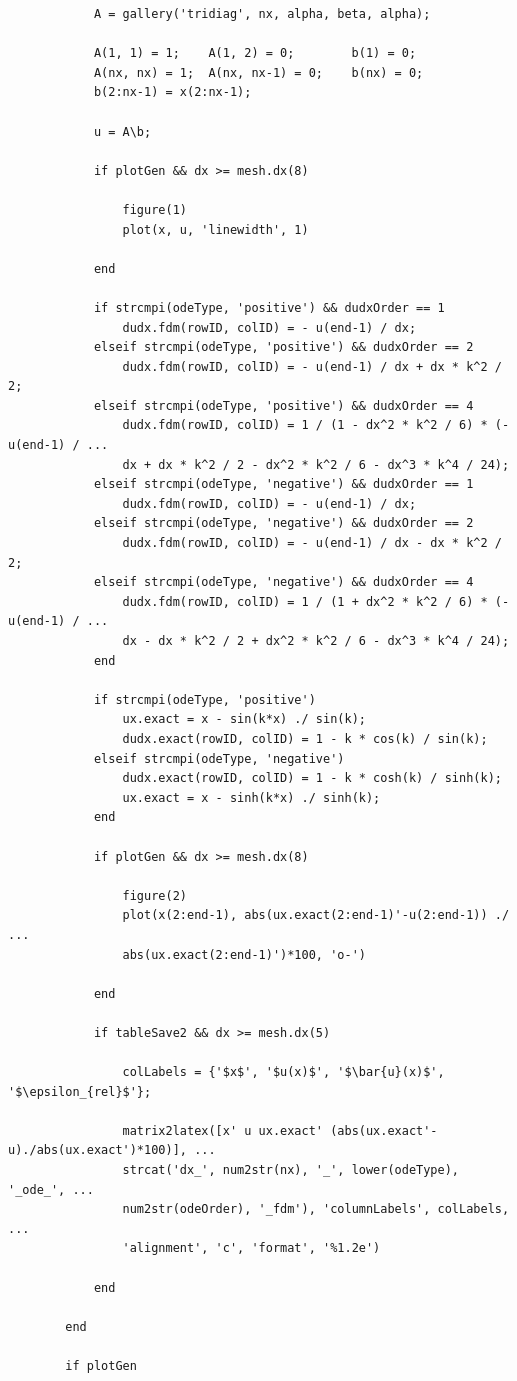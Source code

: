 \documentclass[10pt, reqno]{article}		%
\numberwithin{equation}{section}
\begin{document}
\begin{lstlisting}
			A = gallery('tridiag', nx, alpha, beta, alpha);
			
			A(1, 1) = 1;    A(1, 2) = 0;        b(1) = 0;
			A(nx, nx) = 1;  A(nx, nx-1) = 0;    b(nx) = 0;
			b(2:nx-1) = x(2:nx-1);
			
			u = A\b;
			
			if plotGen && dx >= mesh.dx(8)
			
				figure(1)
				plot(x, u, 'linewidth', 1)
			
			end
			
			if strcmpi(odeType, 'positive') && dudxOrder == 1
				dudx.fdm(rowID, colID) = - u(end-1) / dx;
			elseif strcmpi(odeType, 'positive') && dudxOrder == 2
				dudx.fdm(rowID, colID) = - u(end-1) / dx + dx * k^2 / 2;
			elseif strcmpi(odeType, 'positive') && dudxOrder == 4
				dudx.fdm(rowID, colID) = 1 / (1 - dx^2 * k^2 / 6) * (-u(end-1) / ...
				dx + dx * k^2 / 2 - dx^2 * k^2 / 6 - dx^3 * k^4 / 24);
			elseif strcmpi(odeType, 'negative') && dudxOrder == 1
				dudx.fdm(rowID, colID) = - u(end-1) / dx;
			elseif strcmpi(odeType, 'negative') && dudxOrder == 2
				dudx.fdm(rowID, colID) = - u(end-1) / dx - dx * k^2 / 2;
			elseif strcmpi(odeType, 'negative') && dudxOrder == 4
				dudx.fdm(rowID, colID) = 1 / (1 + dx^2 * k^2 / 6) * (-u(end-1) / ...
				dx - dx * k^2 / 2 + dx^2 * k^2 / 6 - dx^3 * k^4 / 24);
			end
			
			if strcmpi(odeType, 'positive')
				ux.exact = x - sin(k*x) ./ sin(k);
				dudx.exact(rowID, colID) = 1 - k * cos(k) / sin(k);
			elseif strcmpi(odeType, 'negative')
				dudx.exact(rowID, colID) = 1 - k * cosh(k) / sinh(k);
				ux.exact = x - sinh(k*x) ./ sinh(k);
			end
			
			if plotGen && dx >= mesh.dx(8)
			
				figure(2)
				plot(x(2:end-1), abs(ux.exact(2:end-1)'-u(2:end-1)) ./ ...
				abs(ux.exact(2:end-1)')*100, 'o-')
			
			end
			
			if tableSave2 && dx >= mesh.dx(5)
			
				colLabels = {'$x$', '$u(x)$', '$\bar{u}(x)$', '$\epsilon_{rel}$'};
				
				matrix2latex([x' u ux.exact' (abs(ux.exact'-u)./abs(ux.exact')*100)], ...
				strcat('dx_', num2str(nx), '_', lower(odeType), '_ode_', ...
				num2str(odeOrder), '_fdm'), 'columnLabels', colLabels, ...
				'alignment', 'c', 'format', '%1.2e')
			
			end
		
		end
	
		if plotGen
		

\end{lstlisting}
\end{document}
